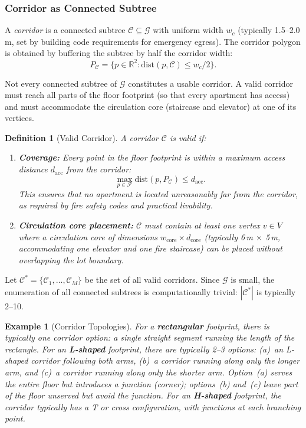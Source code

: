 \documentclass[11pt,a4paper]{article}
\newtheorem{definition}{Definition}
\newtheorem{example}{Example}
\newcommand{\R}{\mathbb{R}}
\newcommand{\calF}{\mathcal{F}}
\newcommand{\calC}{\mathcal{C}}
\newcommand{\calG}{\mathcal{G}}
\begin{document}
\subsubsection{Corridor as Connected Subtree}

A \emph{corridor} is a connected subtree $\calC \subseteq \calG$ with
uniform width $w_c$ (typically 1.5--2.0\,m, set by building code
requirements for emergency egress). The corridor polygon is obtained by
buffering the subtree by half the corridor width:
\[
    P_{\calC} = \bigl\{p \in \R^2 : \text{dist}(p, \calC) \leq w_c/2\bigr\}.
\]

Not every connected subtree of $\calG$ constitutes a usable corridor.
A valid corridor must reach all parts of the floor footprint (so that
every apartment has access) and must accommodate the circulation core
(staircase and elevator) at one of its vertices.

\begin{definition}[Valid Corridor]
A corridor $\calC$ is \emph{valid} if:
\begin{enumerate}[label=(\roman*)]
    \item \textbf{Coverage:} Every point in the floor footprint is within
    a maximum access distance $d_{\text{acc}}$ from the corridor:
    \begin{equation}\label{eq:corridor-valid}
        \max_{p \in \calF} \text{dist}(p, P_{\calC}) \leq d_{\text{acc}}.
    \end{equation}
    This ensures that no apartment is located unreasonably far from the
    corridor, as required by fire safety codes and practical livability.
    \item \textbf{Circulation core placement:} $\calC$ must contain at
    least one vertex $v \in V$ where a circulation core of dimensions
    $w_{\text{core}} \times d_{\text{core}}$ (typically 6\,m $\times$
    5\,m, accommodating one elevator and one fire staircase) can be
    placed without overlapping the lot boundary.
\end{enumerate}
\end{definition}

Let $\calC^* = \{\calC_1, \ldots, \calC_M\}$ be the set of all valid
corridors. Since $\calG$ is small, the enumeration of all connected
subtrees is computationally trivial: $|\calC^*|$ is typically 2--10.

\begin{example}[Corridor Topologies]
For a \textbf{rectangular} footprint, there is typically one corridor
option: a single straight segment running the length of the rectangle.
For an \textbf{L-shaped} footprint, there are typically 2--3 options:
(a)~an L-shaped corridor following both arms, (b)~a corridor running
along only the longer arm, and (c)~a corridor running along only the
shorter arm. Option~(a) serves the entire floor but introduces a
junction (corner); options~(b) and~(c) leave part of the floor
unserved but avoid the junction. For an \textbf{H-shaped} footprint,
the corridor typically has a T or cross configuration, with junctions
at each branching point.
\end{example}
\end{document}
